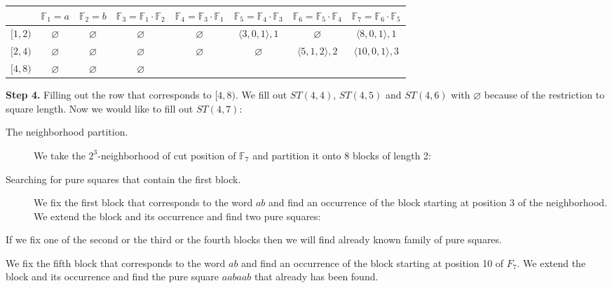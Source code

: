 \documentclass[11pt]{article}
\begin{document}
\begin{appendix}
{\footnotesize\noindent
\begin{tabular}{|c|c|c|c|c|c|c|c|} \hline

 & $\mathbb{F}_1 = a$ & $\mathbb{F}_2 = b$ & $\mathbb{F}_3 = \mathbb{F}_1 \cdot \mathbb{F}_2$ & $\mathbb{F}_4 =
 \mathbb{F}_3 \cdot \mathbb{F}_1$ & $\mathbb{F}_5 = \mathbb{F}_4 \cdot \mathbb{F}_3$ & $\mathbb{F}_6 = \mathbb{F}_5
 \cdot \mathbb{F}_4$ & $\mathbb{F}_7 = \mathbb{F}_6 \cdot \mathbb{F}_5$ \\ \hline

 $[1, 2)$ & $\varnothing$ & $\varnothing$ & $\varnothing$ & $\varnothing$ & $\langle3, 0, 1\rangle, 1$ & $\varnothing$ & $\langle8, 0, 1\rangle, 1$\\ \hline

 $[2, 4)$ & $\varnothing$ & $\varnothing$ & $\varnothing$ & $\varnothing$ & $\varnothing$ & $\langle5, 1, 2\rangle, 2$ & $\langle10, 0, 1\rangle, 3$ \\ \hline

 $[4, 8)$ & $\varnothing$ & $\varnothing$ & $\varnothing$ & & & & \\ \hline
\end{tabular}
}

{\bf Step 4.} Filling out the row that corresponds to $[4,8)$. We fill out $ST(4, 4)$, $ST(4, 5)$ and $ST(4, 6)$ with
$\varnothing$ because of the restriction to square length. Now we would like to fill out $ST(4,7)$:

\begin{description}
\item[The neighborhood partition.]
We take the $2^3$-neighborhood of cut position of $\mathbb{F}_7$
and partition it onto 8 blocks of length 2:
\end{description}
\CurrentNeighborhoodPictureTwo{}
\begin{description}
\item[Searching for pure squares that contain the first block.]
We fix the first block that corresponds to the word $ab$ and find
an occurrence of the block starting at position 3 of the
neighborhood. We extend the block and its occurrence and find two
pure squares:
\end{description}
\BlocksExtensionPictureTwo{}
\begin{description}
\item[Similar cases.]
If we fix one of the second or the third or the fourth blocks then
we will find already known family of pure squares.
\item[Last case.]
We fix the fifth block that corresponds to the word $ab$ and find
an occurrence of the block starting at position 10 of $F_7$. We
extend the block and its occurrence and find the pure square
$aabaab$ that already has been found.
\item
\end{description}


\end{appendix}
\end{document}
